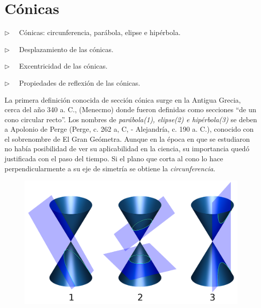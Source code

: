 \chapter{Cónicas}

\vspace{5mm}


\begin{adjustwidth}{40pt}{40pt}
\begin{cuadro-gris}

	\begin{multicols}{2}
	$\triangleright \quad$  Cónicas: circunferencia, parábola, elipse e hipérbola.
	
	$\triangleright \quad$  Desplazamiento de las cónicas.
	
	$\triangleright \quad$  Excentricidad de las cónicas.
	
	$\triangleright \quad$  Propiedades de reflexión de las cónicas.
	\end{multicols}
	
\end{cuadro-gris}
\end{adjustwidth}


\vspace{5mm}
La primera definición conocida de sección cónica surge en la Antigua Grecia, cerca del año 340 a. C., (Menecmo) donde fueron definidas como secciones ``de un cono circular recto''. Los nombres de \emph{parábola(1), elipse(2) e hipérbola(3)} se deben a Apolonio de Perge (Perge, c. 262 a, C, - Alejandría, c. 190 a. C.), conocido con el sobrenombre de El Gran Geómetra.  Aunque en la época en que se estudiaron no había posibilidad de ver su aplicabilidad en la ciencia, su importancia quedó justificada con el paso del tiempo. \textcolor{gris}{Si el plano que corta al cono lo hace perpendicularmente a su eje de simetría se obtiene la \emph{circunferencia}.}

\begin{figure}[H]
	\centering
	\includegraphics[width=.7\textwidth]{img-conicas/conicas00.png}
	\end{figure}

